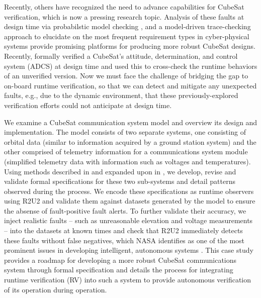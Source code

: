 \documentclass[conf]{new-aiaa}
\begin{document}

Recently, others have recognized the need to advance capabilities for CubeSat verification, which is now a pressing research topic. Analysis of these faults at design time via probabilstic model checking \cite{PLMJZ13}, and a model-driven trace-checking approach to elucidate on the most frequent requirement types in cyber-physical systems \cite{Boufaied2020} provide promising platforms for producing more robust CubeSat designs. Recently, \cite{Gross2020} formally verified a CubeSat's attitude, determination, and control system (ADCS) at design time and used this to cross-check the runtime behaviors of an unverified version. Now we must face the challenge of bridging the gap to on-board runtime verification, so that we can detect and mitigate any unexpected faults, e.g., due to the dynamic environment, that these previously-explored verification efforts could not anticipate at design time.

We examine a CubeSat communication system model and overview its design and implementation. The model consists of two separate systems, one consisting of orbital data (similar to information acquired by a ground station system) and the other comprised of telemetry information for a communications system module (simplified telemetry data with information such as voltages and temperatures). Using methods described in \cite{Roz16} and expanded upon in \cite{Cauwels2020}, we develop, revise and validate formal specifications for these two sub-systems and detail patterns observed during the process.
We encode these specifications as runtime observers using R2U2 and validate them against datasets generated by the model to ensure the absense of fault-positive fault alerts. To further validate their accuracy, we inject realistic faults -- such as unreasonable elevation and voltage measurements -- into the datasets at known times and check that R2U2 immediately detects these faults without false negatives, which NASA identifies as one of the most prominent issues in developing intelligent, autonomous systems \cite{Roadmap2015}. This case study provides a roadmap for developing a more robust CubeSat communications system through formal specification and details the process for integrating runtime verification (RV) into such a system to provide autonomous verification of its operation during operation.
\end{document}
